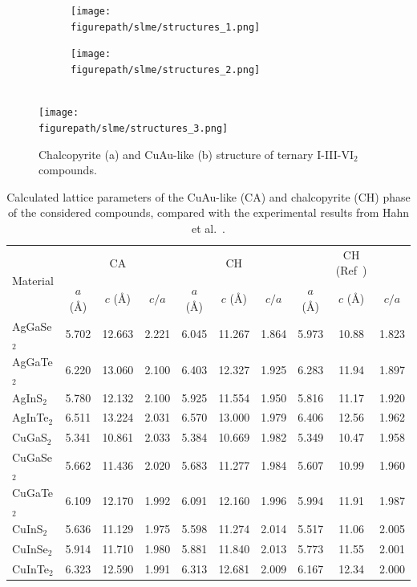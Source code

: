 \begin{refsection}
\begin{figure}[ht]  
\setlength{\captionmargin}{10pt} 
\centering 
\begin{subfigure}{0.24\textwidth} 
\centering 
\texttt{[image: \\figurepath/slme/structures\_1.png]} 
\caption{} 
\end{subfigure}%
\begin{subfigure}{0.24\textwidth} 
\centering 
\texttt{[image: \\figurepath/slme/structures\_2.png]} 
\caption{} 
\end{subfigure} 
\vspace{0.7em}\\ 
\texttt{[image: \\figurepath/slme/structures\_3.png]} 
\caption{\label{slme:fig-CuAu_structure} Chalcopyrite (a) and CuAu-like (b) 
structure of ternary \mbox{I-III-VI$_2$} compounds.} 
\end{figure} 
 
\begin{table}[ht] 
\centering 
\renewcommand{\arraystretch}{1.3} 
\caption{Calculated lattice parameters of the \mbox{CuAu-like} (CA) and chalcopyrite (CH) 
phase of the considered compounds, compared with the experimental results from Hahn et al.~\cite{Hahn1953}.} 
\label{slme:tab-lattice} 
\begin{tabular*}{\textwidth}{@{\extracolsep{\fill}}lccccccccc}\hline 
\multirow{2}{*}{Material}    & & CA & & & CH & & & CH (Ref~\cite{Hahn1953}) & 
\\ \cmidrule(lr){2-4} \cmidrule(lr){5-7} \cmidrule(lr){8-10} 
 			&  $a$ (\si{\angstrom}) & $c$ (\si{\angstrom}) & $c/a$ & $a$ 
(\si{\angstrom}) & $c$ (\si{\angstrom}) & $c/a$ & $a$ (\si{\angstrom}) & $c$ 
(\si{\angstrom}) & $c/a$ \\\hline 
AgGaSe$_2$ 	& 5.702 & 12.663 & 2.221 & 6.045 & 11.267 & 1.864 & 5.973 & 10.88 
& 1.823 \\ 
AgGaTe$_2$ 	& 6.220 & 13.060 & 2.100 & 6.403 & 12.327 & 1.925 & 6.283 & 11.94 
& 1.897 \\ 
AgInS$_2$  	& 5.780 & 12.132 & 2.100 & 5.925 & 11.554 & 1.950 & 5.816 & 11.17 
& 1.920 \\ 
AgInTe$_2$ 	& 6.511 & 13.224 & 2.031 & 6.570 & 13.000 & 1.979 & 6.406 & 12.56 
& 1.962 \\ 
CuGaS$_2$  	& 5.341 & 10.861 & 2.033 & 5.384 & 10.669 & 1.982 & 5.349 & 10.47 
& 1.958 \\ 
CuGaSe$_2$ 	& 5.662 & 11.436 & 2.020 & 5.683 & 11.277 & 1.984 & 5.607 & 10.99 
& 1.960 \\ 
CuGaTe$_2$ 	& 6.109 & 12.170 & 1.992 & 6.091 & 12.160 & 1.996 & 5.994 & 11.91 
& 1.987 \\ 
CuInS$_2$ 	& 5.636 & 11.129 & 1.975 & 5.598 & 11.274 & 2.014 & 5.517 & 11.06 & 
2.005 \\ 
CuInSe$_2$ 	& 5.914 & 11.710 & 1.980 & 5.881 & 11.840 & 2.013 & 5.773 & 11.55 
& 2.001 \\ 
CuInTe$_2$ 	& 6.323 & 12.590 & 1.991 & 6.313 & 12.681 & 2.009 & 6.167 & 12.34 
& 2.000 \\ \hline 
\end{tabular*} 
\end{table} 


\end{refsection}
